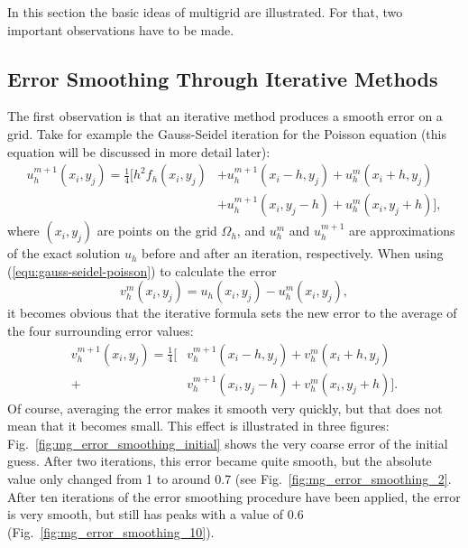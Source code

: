 In this section the basic ideas of multigrid are illustrated. For that, two important observations have to be made.
\subsection{Error Smoothing Through Iterative Methods}
The first observation is that an iterative method produces a smooth error on a grid. Take for example the Gauss-Seidel iteration for the Poisson equation (this equation will be discussed in more detail later):
\begin{align}
\label{equ:gauss-seidel-poisson}
u_h^{m+1}(x_i,y_j) =  \frac{1}{4} [h^2 f_h (x_i, y_j) & +  u_h^{m+1} (x_i-h, y_j) + u_h^{m}(x_i+h, y_j) \nonumber \\ 
& + u_h^{m+1}(x_i, y_j -h) + u_h^{m} (x_i, y_j+h)],
\end{align}
where $(x_i, y_j)$ are points on the grid $\Omega_h$, and $u_h^m$ and $u_h^{m+1}$ are approximations of the exact solution $u_h$ before and after an iteration, respectively. When using (\ref{equ:gauss-seidel-poisson}) to calculate the error 
\begin{equation}
v_h^m(x_i, y_j) = u_h(x_i, y_j) - u_h^m(x_i, y_j),
\end{equation}
it becomes obvious that the iterative formula sets the new error to the average of the four surrounding error values:
\begin{align}
v_h^{m+1}(x_i, y_j) = \frac{1}{4}[&v_h^{m+1}(x_i-h, y_j) + v_h^{m}(x_i+h, y_j)\nonumber \\
 + &v_h^{m+1}(x_i, y_j-h) + v_h^{m}(x_i, y_j + h)].
\end{align}
Of course, averaging the error makes it smooth very quickly, but that does not mean that it becomes small. This effect is illustrated in three figures: Fig.~\ref{fig:mg_error_smoothing_initial} shows the very coarse error of the initial guess. After two iterations, this error became quite smooth, but the absolute value only changed from 1 to around 0.7 (see Fig.~\ref{fig:mg_error_smoothing_2}. After ten iterations of the error smoothing procedure have been applied, the error is very smooth, but still has peaks with a value of 0.6 (Fig.~\ref{fig:mg_error_smoothing_10}). 

